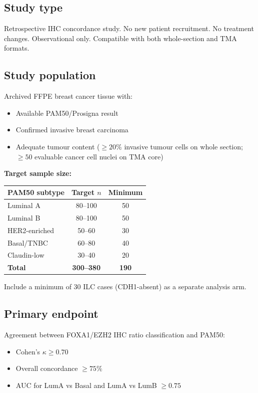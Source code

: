 \documentclass[11pt, a4paper]{article}
\begin{document}
\subsection{Study type}

Retrospective IHC concordance study.
No new patient recruitment. No treatment
changes. Observational only. Compatible
with both whole-section and TMA formats.

\subsection{Study population}

Archived FFPE breast cancer tissue with:
\begin{itemize}[noitemsep]
    \item Available PAM50/Prosigna result
    \item Confirmed invasive breast carcinoma
    \item Adequate tumour content
    ($\geq 20\%$ invasive tumour cells on
    whole section; $\geq 50$ evaluable
    cancer cell nuclei on TMA core)
\end{itemize}

\textbf{Target sample size:}

\begin{center}
\begin{tabular}{lcc}
\toprule
\textbf{PAM50 subtype} &
\textbf{Target $n$} &
\textbf{Minimum} \\
\midrule
Luminal A & 80--100 & 50 \\
Luminal B & 80--100 & 50 \\
HER2-enriched & 50--60 & 30 \\
Basal/TNBC & 60--80 & 40 \\
Claudin-low & 30--40 & 20 \\
\textbf{Total} &
\textbf{300--380} & \textbf{190} \\
\bottomrule
\end{tabular}
\end{center}

Include a minimum of 30 ILC cases
(CDH1-absent) as a separate analysis arm.

\subsection{Primary endpoint}

Agreement between FOXA1/EZH2 IHC ratio
classification and PAM50:
\begin{itemize}[noitemsep]
    \item Cohen's $\kappa \geq 0.70$
    \item Overall concordance $\geq 75\%$
    \item AUC for LumA vs Basal and LumA
    vs LumB $\geq 0.75$
\end{itemize}
\end{document}
